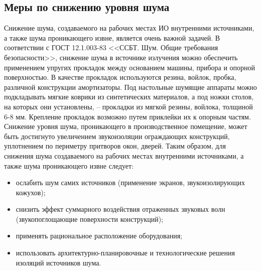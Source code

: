 \documentclass[utf8,usehyperref,12pt]{G7-32}
\begin{document}
\subsection{Меры по снижению уровня шума}
Снижение шума, создаваемого на рабочих местах ИО внутренними источниками, а также шума проникающего извне, является очень важной задачей. В соответствии с ГОСТ 12.1.003-83 <<ССБТ. Шум. Общие требования безопасности>>, снижение шума в источнике излучения можно обеспечить применением упругих прокладок между основанием машины, прибора и опорной поверхностью. В качестве прокладок используются резина, войлок, пробка, различной конструкции амортизаторы. Под настольные шумящие аппараты можно подкладывать мягкие коврики из синтетических материалов, а под ножки столов, на которых они установлены, – прокладки из мягкой резины, войлока, толщиной 6-8 мм. Крепление прокладок возможно путем приклейки их к опорным частям. 
Снижение уровня шума, проникающего в производственное помещение, может быть достигнуто увеличением звукоизоляции ограждающих конструкций, уплотнением по периметру притворов окон, дверей. 
Таким образом, для снижения шума создаваемого на рабочих местах внутренними источниками, а также шума проникающего извне следует:
\begin{itemize}
 \item ослабить шум самих источников (применение экранов, звукоизолирующих кожухов);
 \item снизить эффект суммарного воздействия отраженных звуковых волн (звукопоглощающие поверхности конструкций);
 \item применять рациональное расположение оборудования;
 \item использовать архитектурно-планировочные и технологические решения изоляций источников шума.
\end{itemize}
\end{document}

